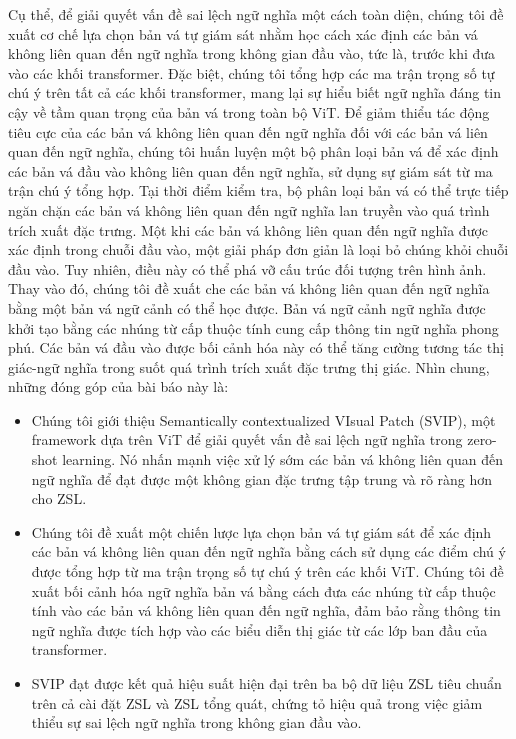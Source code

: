 Cụ thể, để giải quyết vấn đề sai lệch ngữ nghĩa một cách toàn diện, chúng tôi đề xuất cơ chế lựa chọn bản vá tự giám sát nhằm học cách xác định các bản vá không liên quan đến ngữ nghĩa trong không gian đầu vào, tức là, trước khi đưa vào các khối transformer. Đặc biệt, chúng tôi tổng hợp các ma trận trọng số tự chú ý trên tất cả các khối transformer, mang lại sự hiểu biết ngữ nghĩa đáng tin cậy về tầm quan trọng của bản vá trong toàn bộ ViT. Để giảm thiểu tác động tiêu cực của các bản vá không liên quan đến ngữ nghĩa đối với các bản vá liên quan đến ngữ nghĩa, chúng tôi huấn luyện một bộ phân loại bản vá để xác định các bản vá đầu vào không liên quan đến ngữ nghĩa, sử dụng sự giám sát từ ma trận chú ý tổng hợp. Tại thời điểm kiểm tra, bộ phân loại bản vá có thể trực tiếp ngăn chặn các bản vá không liên quan đến ngữ nghĩa lan truyền vào quá trình trích xuất đặc trưng. Một khi các bản vá không liên quan đến ngữ nghĩa được xác định trong chuỗi đầu vào, một giải pháp đơn giản là loại bỏ chúng khỏi chuỗi đầu vào. Tuy nhiên, điều này có thể phá vỡ cấu trúc đối tượng trên hình ảnh. Thay vào đó, chúng tôi đề xuất che các bản vá không liên quan đến ngữ nghĩa bằng một bản vá ngữ cảnh có thể học được. Bản vá ngữ cảnh ngữ nghĩa được khởi tạo bằng các nhúng từ cấp thuộc tính cung cấp thông tin ngữ nghĩa phong phú. Các bản vá đầu vào được bối cảnh hóa này có thể tăng cường tương tác thị giác-ngữ nghĩa trong suốt quá trình trích xuất đặc trưng thị giác. Nhìn chung, những đóng góp của bài báo này là:
\begin{itemize}
    \item Chúng tôi giới thiệu Semantically contextualized VIsual Patch (SVIP), một framework dựa trên ViT để giải quyết vấn đề sai lệch ngữ nghĩa trong zero-shot learning. Nó nhấn mạnh việc xử lý sớm các bản vá không liên quan đến ngữ nghĩa để đạt được một không gian đặc trưng tập trung và rõ ràng hơn cho ZSL.
    \item Chúng tôi đề xuất một chiến lược lựa chọn bản vá tự giám sát để xác định các bản vá không liên quan đến ngữ nghĩa bằng cách sử dụng các điểm chú ý được tổng hợp từ ma trận trọng số tự chú ý trên các khối ViT. Chúng tôi đề xuất bối cảnh hóa ngữ nghĩa bản vá bằng cách đưa các nhúng từ cấp thuộc tính vào các bản vá không liên quan đến ngữ nghĩa, đảm bảo rằng thông tin ngữ nghĩa được tích hợp vào các biểu diễn thị giác từ các lớp ban đầu của transformer.
    \item SVIP đạt được kết quả hiệu suất hiện đại trên ba bộ dữ liệu ZSL tiêu chuẩn trên cả cài đặt ZSL và ZSL tổng quát, chứng tỏ hiệu quả trong việc giảm thiểu sự sai lệch ngữ nghĩa trong không gian đầu vào.
\end{itemize}